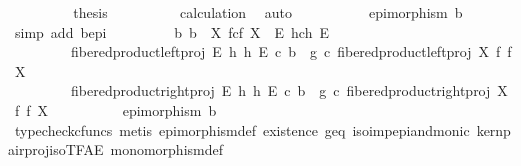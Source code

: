 \begin{isabellebody}
\ \ \ \ \ \ \isamarkupfalse%
\ \isamarkupfalse%
\ {\isacharquery}{\kern0pt}thesis\isanewline
\ \ \ \ \ \ \ \ \isamarkupfalse%
\ calculation\ \isamarkupfalse%
\ auto\isanewline
\ \ \ \ \isamarkupfalse%
\isanewline
\ \ \ \ \isamarkupfalse%
\ {\isachardoublequoteopen}epimorphism\ b{\isachardoublequoteclose}\isanewline
\ \ \ \ \ \ \isamarkupfalse%
\ {\isacharparenleft}{\kern0pt}simp\ add{\isacharcolon}{\kern0pt}\ b{\isacharunderscore}{\kern0pt}epi{\isacharparenright}{\kern0pt}\isanewline
\ \ \isamarkupfalse%
\ \ \isanewline
\ \ \isamarkupfalse%
\ {\isachardoublequoteopen}{\isasymexists}{\isacharbang}{\kern0pt}b{\isachardot}{\kern0pt}\ b\ {\isacharcolon}{\kern0pt}\ X\ \isactrlbsub f\isactrlesub {\isasymtimes}\isactrlsub c\isactrlbsub f\isactrlesub \ X\ {\isasymrightarrow}\ E\ \isactrlbsub h\isactrlesub {\isasymtimes}\isactrlsub c\isactrlbsub h\isactrlesub \ E\ {\isasymand}\isanewline
\ \ \ \ \ \ \ \ \ fibered{\isacharunderscore}{\kern0pt}product{\isacharunderscore}{\kern0pt}left{\isacharunderscore}{\kern0pt}proj\ E\ h\ h\ E\ {\isasymcirc}\isactrlsub c\ b\ {\isacharequal}{\kern0pt}\ g\ {\isasymcirc}\isactrlsub c\ fibered{\isacharunderscore}{\kern0pt}product{\isacharunderscore}{\kern0pt}left{\isacharunderscore}{\kern0pt}proj\ X\ f\ f\ X\ {\isasymand}\isanewline
\ \ \ \ \ \ \ \ \ fibered{\isacharunderscore}{\kern0pt}product{\isacharunderscore}{\kern0pt}right{\isacharunderscore}{\kern0pt}proj\ E\ h\ h\ E\ {\isasymcirc}\isactrlsub c\ b\ {\isacharequal}{\kern0pt}\ g\ {\isasymcirc}\isactrlsub c\ fibered{\isacharunderscore}{\kern0pt}product{\isacharunderscore}{\kern0pt}right{\isacharunderscore}{\kern0pt}proj\ X\ f\ f\ X\ {\isasymand}\isanewline
\ \ \ \ \ \ \ \ \ epimorphism\ b{\isachardoublequoteclose}\isanewline
\ \ \ \ \isamarkupfalse%
\ {\isacharparenleft}{\kern0pt}typecheck{\isacharunderscore}{\kern0pt}cfuncs{\isacharcomma}{\kern0pt}\ metis\ epimorphism{\isacharunderscore}{\kern0pt}def{}\ existence\ g{\isacharunderscore}{\kern0pt}eq\ iso{\isacharunderscore}{\kern0pt}imp{\isacharunderscore}{\kern0pt}epi{\isacharunderscore}{\kern0pt}and{\isacharunderscore}{\kern0pt}monic\ kern{\isacharunderscore}{\kern0pt}pair{\isacharunderscore}{\kern0pt}proj{\isacharunderscore}{\kern0pt}iso{\isacharunderscore}{\kern0pt}TFAE{}\ monomorphism{\isacharunderscore}{\kern0pt}def{}{\isacharparenright}{\kern0pt}\isanewline
{}\isamarkupfalse%
%
\endisatagproof
{\isafoldproof}%
%
\isadelimproof

\end{isabellebody}
